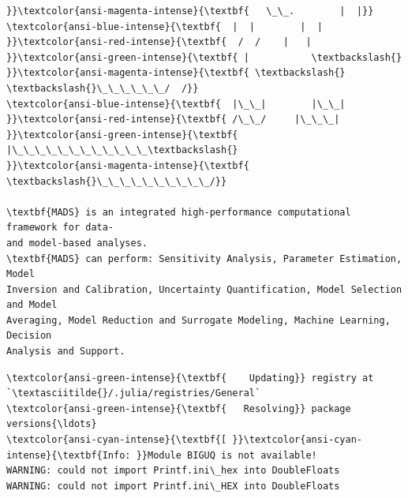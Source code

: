 \documentclass[11pt]{article}
\begin{document}
\begin{Verbatim}[commandchars=\\\{\}]
}}\textcolor{ansi-magenta-intense}{\textbf{   \_\_.        |  |}}
\textcolor{ansi-blue-intense}{\textbf{  |  |        |  | }}\textcolor{ansi-red-intense}{\textbf{  /  /    |   | }}\textcolor{ansi-green-intense}{\textbf{ |           \textbackslash{}
}}\textcolor{ansi-magenta-intense}{\textbf{ \textbackslash{}  \textbackslash{}\_\_\_\_\_\_/  /}}
\textcolor{ansi-blue-intense}{\textbf{  |\_\_|        |\_\_| }}\textcolor{ansi-red-intense}{\textbf{ /\_\_/     |\_\_\_| }}\textcolor{ansi-green-intense}{\textbf{ |\_\_\_\_\_\_\_\_\_\_\_\_\textbackslash{}
}}\textcolor{ansi-magenta-intense}{\textbf{  \textbackslash{}\_\_\_\_\_\_\_\_\_\_/}}

\textbf{MADS} is an integrated high-performance computational framework for data-
and model-based analyses.
\textbf{MADS} can perform: Sensitivity Analysis, Parameter Estimation, Model
Inversion and Calibration, Uncertainty Quantification, Model Selection and Model
Averaging, Model Reduction and Surrogate Modeling, Machine Learning, Decision
Analysis and Support.
    \end{Verbatim}

    \begin{Verbatim}[commandchars=\\\{\}]
\textcolor{ansi-green-intense}{\textbf{    Updating}} registry at `\textasciitilde{}/.julia/registries/General`
\textcolor{ansi-green-intense}{\textbf{   Resolving}} package versions{\ldots}
\textcolor{ansi-cyan-intense}{\textbf{[ }}\textcolor{ansi-cyan-intense}{\textbf{Info: }}Module BIGUQ is not available!
WARNING: could not import Printf.ini\_hex into DoubleFloats
WARNING: could not import Printf.ini\_HEX into DoubleFloats
    \end{Verbatim}
\end{document}
